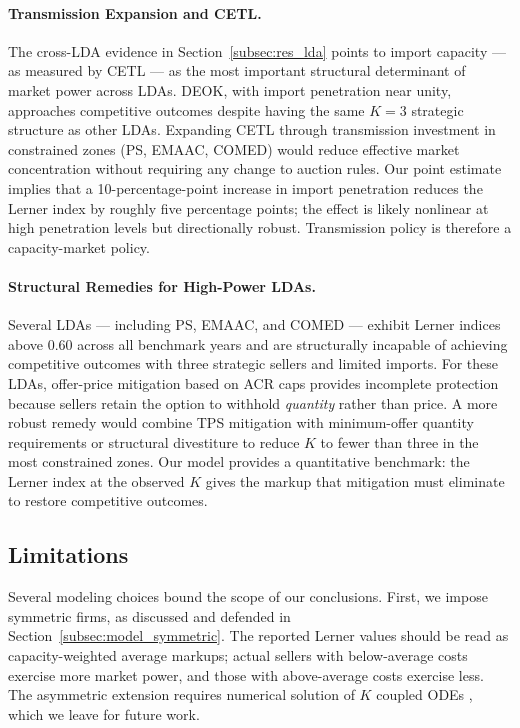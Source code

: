 \paragraph{Transmission Expansion and CETL.}
The cross-LDA evidence in Section~\ref{subsec:res_lda} points to import
capacity --- as measured by CETL --- as the most important structural
determinant of market power across LDAs. DEOK, with import penetration near
unity, approaches competitive outcomes despite having the same $K = 3$
strategic structure as other LDAs. Expanding CETL through transmission
investment in constrained zones (PS, EMAAC, COMED) would reduce effective
market concentration without requiring any change to auction rules. Our
point estimate implies that a 10-percentage-point increase in import
penetration reduces the Lerner index by roughly five percentage points; the
effect is likely nonlinear at high penetration levels but directionally
robust. Transmission policy is therefore a capacity-market policy.

\paragraph{Structural Remedies for High-Power LDAs.}
Several LDAs --- including PS, EMAAC, and COMED --- exhibit Lerner indices
above 0.60 across all benchmark years and are structurally incapable of
achieving competitive outcomes with three strategic sellers and limited
imports. For these LDAs, offer-price mitigation based on ACR caps provides
incomplete protection because sellers retain the option to withhold
\textit{quantity} rather than price. A more robust remedy would combine TPS
mitigation with minimum-offer quantity requirements or structural divestiture
to reduce $K$ to fewer than three in the most constrained zones. Our model provides
a quantitative benchmark: the Lerner index at the observed $K$ gives the
markup that mitigation must eliminate to restore competitive outcomes.

\subsection{Limitations}
\label{subsec:disc_limitations}

Several modeling choices bound the scope of our conclusions. First, we impose
symmetric firms, as discussed and defended in Section~\ref{subsec:model_symmetric}.
The reported Lerner values should be read as capacity-weighted average markups;
actual sellers with below-average costs exercise more market power, and those
with above-average costs exercise less. The asymmetric extension requires
numerical solution of $K$ coupled ODEs \citep{Anderson2008_sfe_asymmetric},
which we leave for future work.

